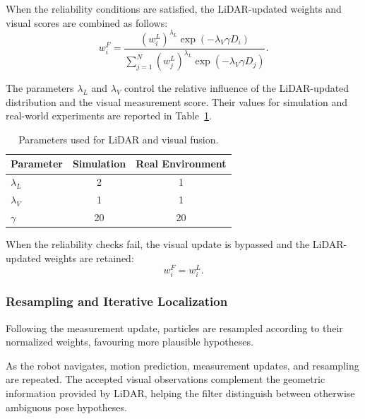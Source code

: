 \documentclass[a4paper,11pt,oneside]{book}
\begin{document}
When the reliability conditions are satisfied, the LiDAR-updated
weights and visual scores are combined as follows:
\begin{equation}
    w_i^{F}
    =
    \frac{
        (w_i^{L})^{\lambda_L}
        \exp\left(-\lambda_V\gamma D_i\right)
    }{
        \displaystyle\sum_{j=1}^{N}
        (w_j^{L})^{\lambda_L}
        \exp\left(-\lambda_V\gamma D_j\right)
    }.
    \label{eq:fused_particle_weights}
\end{equation}

The parameters $\lambda_L$ and $\lambda_V$ control the relative
influence of the LiDAR-updated distribution and the visual
measurement score. Their values for simulation and real-world
experiments are reported in Table~\ref{tab:amcl_fusion_parameters}.

\begin{table}[H]
    \centering
    \begin{tabular}{lcc}
        \toprule
        \textbf{Parameter}
        & \textbf{Simulation}
        & \textbf{Real Environment} \\
        \midrule
        $\lambda_L$ & 2  & 1 \\
        $\lambda_V$ & 1  & 1 \\
        $\gamma$    & 20 & 20 \\
        \bottomrule
    \end{tabular}
    \caption{Parameters used for LiDAR and visual fusion.}
    \label{tab:amcl_fusion_parameters}
\end{table}

When the reliability checks fail, the visual update is bypassed
and the LiDAR-updated weights are retained:
\begin{equation}
    w_i^{F}=w_i^{L}.
\end{equation}

\subsubsection{Resampling and Iterative Localization}

Following the measurement update, particles are resampled according
to their normalized weights, favouring more plausible hypotheses.

As the robot navigates, motion prediction, measurement updates,
and resampling are repeated. The accepted visual observations
complement the geometric information provided by LiDAR,
helping the filter distinguish between otherwise ambiguous
pose hypotheses.
\end{document}
